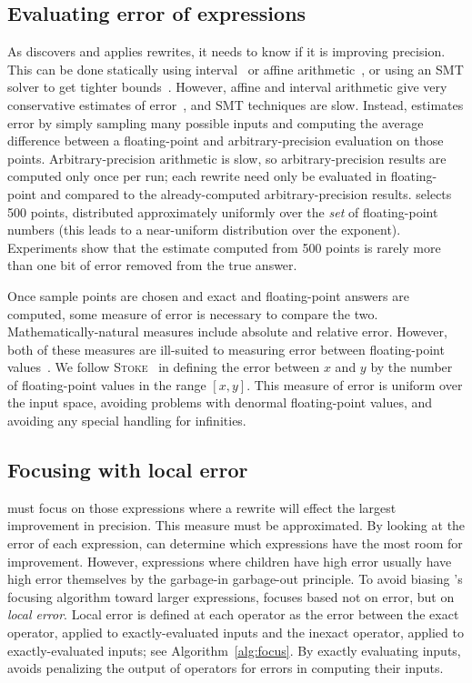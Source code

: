 \documentclass[paper.tex]{subfiles}
\begin{document}

\subsection{Evaluating error of expressions}

As \casio discovers and applies rewrites,
  it needs to know if it is improving precision.
This can be done statically using interval~\cite{} or affine arithmetic~\cite{},
  or using an SMT solver to get tighter bounds~\cite{}.
However, affine and interval arithmetic give
  very conservative estimates of error~\cite{},
  and SMT techniques are slow.
Instead, \casio estimates error by simply sampling many possible inputs
  and computing the average difference between a floating-point
  and arbitrary-precision evaluation on those points.
Arbitrary-precision arithmetic is slow,
  so arbitrary-precision results are computed only once per run;
  each rewrite need only be evaluated in floating-point
  and compared to the already-computed arbitrary-precision results.
\casio selects 500 points, distributed approximately uniformly
  over the \emph{set} of floating-point numbers
  (this leads to a near-uniform distribution over the exponent).
Experiments show that the estimate computed from 500 points
  is rarely more than one bit of error removed from the true answer.

Once sample points are chosen
  and exact and floating-point answers are computed,
  some measure of error is necessary to compare the two.
Mathematically-natural measures include absolute and relative error.
However, both of these measures are ill-suited
  to measuring error between floating-point values~\cite{}.
We follow \textsc{Stoke}~\cite{} in defining the error between $x$ and $y$
  by the number of floating-point values in the range $[x, y]$.
This measure of error is uniform over the input space,
  avoiding problems with denormal floating-point values,
  and avoiding any special handling for infinities.

\subsection{Focusing with local error}

\casio must focus on those expressions
  where a rewrite will effect the largest improvement in precision.
This measure must be approximated.
By looking at the error of each expression,
  \casio can determine which expressions
  have the most room for improvement.
However, expressions where children have high error
  usually have high error themselves by
  the garbage-in garbage-out principle.
To avoid biasing \casio's focusing algorithm
  toward larger expressions, \casio focuses
  based not on error, but on \emph{local error}.
Local error is defined at each operator
  as the error between
  the exact operator, applied to exactly-evaluated inputs
  and the inexact operator, applied to exactly-evaluated inputs;
  see Algorithm~\ref{alg:focus}.
By exactly evaluating inputs,
  \casio avoids penalizing the output of operators
  for errors in computing their inputs.
\end{document}
